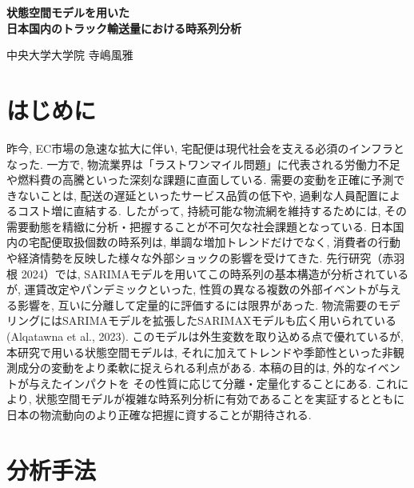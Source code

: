 \documentclass[a4paper, 10pt]{jarticle}
\begin{document}
\begin{center}
  \bfseries 
  {\huge 状態空間モデルを用いた\\日本国内のトラック輸送量における時系列分析} 
  \vspace{1.5ex} 

  中央大学大学院 寺嶋風雅 \\ 
\end{center}
\vspace{3ex}

\section{はじめに} 
\titlespacing*{\section}{0pt}{1.0ex}{0.8ex}
昨今, EC市場の急速な拡大に伴い, 宅配便は現代社会を支える必須のインフラとなった. 
一方で, 物流業界は「ラストワンマイル問題」に代表される労働力不足や燃料費の高騰といった深刻な課題に直面している. 
需要の変動を正確に予測できないことは, 配送の遅延といったサービス品質の低下や, 過剰な人員配置によるコスト増に直結する. 
したがって, 持続可能な物流網を維持するためには, その需要動態を精緻に分析・把握することが不可欠な社会課題となっている. 
日本国内の宅配便取扱個数の時系列は, 単調な増加トレンドだけでなく, 
消費者の行動や経済情勢を反映した様々な外部ショックの影響を受けてきた. 
先行研究（赤羽根 2024）では, SARIMAモデルを用いてこの時系列の基本構造が分析されているが, 
運賃改定やパンデミックといった, 性質の異なる複数の外部イベントが与える影響を, 互いに分離して定量的に評価するには限界があった. 
物流需要のモデリングにはSARIMAモデルを拡張したSARIMAXモデルも広く用いられている(Alqatawna et al., 2023). 
このモデルは外生変数を取り込める点で優れているが, 本研究で用いる状態空間モデルは, 
それに加えてトレンドや季節性といった非観測成分の変動をより柔軟に捉えられる利点がある.
 本稿の目的は, 外的なイベントが与えたインパクトを
その性質に応じて分離・定量化することにある. これにより, 状態空間モデルが複雑な時系列分析に有効であることを実証するとともに
日本の物流動向のより正確な把握に資することが期待される. 
\section{分析手法} 
\titlespacing*{\section}{0pt}{1.0ex}{0.8ex}
\end{document}
